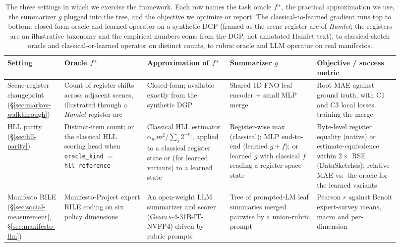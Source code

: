 \begin{table}[t]
\centering\small
\setlength{\tabcolsep}{4pt}
\begin{tabular}{p{0.11\linewidth}p{0.20\linewidth}p{0.20\linewidth}p{0.21\linewidth}p{0.20\linewidth}}
\toprule
Setting & Oracle $f^\ast$ & Approximation of $f^\ast$ & Summarizer $g$ & Objective / success metric \\
\midrule
Scene-register changepoint (\S\ref{sec:markov-walkthrough}) &
Count of register shifts across adjacent scenes, illustrated through a \emph{Hamlet} register arc &
Closed-form; available exactly from the synthetic DGP &
Shared 1D FNO leaf encoder $+$ small MLP merge &
Root MAE against ground truth, with C1 and C3 local losses training the merge \\[2pt]
HLL parity (\S\ref{sec:hll-parity}) &
Distinct-item count; or the classical HLL scoring head when \texttt{oracle\_kind} $=$ \texttt{hll\_reference} &
Classical HLL estimator $\alpha_m m^2 / \sum_j 2^{-r_j}$, applied to a classical register state or (for learned variants) to a learned state &
Register-wise max (classical); MLP end-to-end (learned $g{+}f$); or learned $g$ with classical $f$ reading a register-space state &
Byte-level register equality (native) or estimate-equivalence within $2\times$ RSE (DataSketches); relative MAE vs.\ the oracle for the learned variants \\[2pt]
Manifesto RILE (\S\ref{sec:social-measurement}, \S\ref{sec:manifesto-llm}) &
Manifesto-Project expert RILE coding on six policy dimensions &
An open-weight LLM summarizer and scorer (\textsc{Gemma-4-31B-IT-NVFP4}) driven by rubric prompts &
Tree of prompted-LM leaf summaries merged pairwise by a union-rubric prompt &
Pearson $r$ against Benoit expert-survey means, macro and per-dimension \\
\bottomrule
\end{tabular}
\caption{The three settings in which we exercise the framework. Each row names the task oracle $f^\ast$, the practical approximation we use, the summarizer $g$ plugged into the tree, and the objective we optimize or report. The classical-to-learned gradient runs top to bottom: closed-form oracle and learned operator on a synthetic DGP (framed as the scene-register arc of \emph{Hamlet}; the registers are an illustrative taxonomy and the empirical numbers come from the DGP, not annotated Hamlet text), to classical-sketch oracle and classical-or-learned operator on distinct counts, to rubric oracle and LLM operator on real manifestos.}
\label{tab:settings-comparison}
\end{table}

